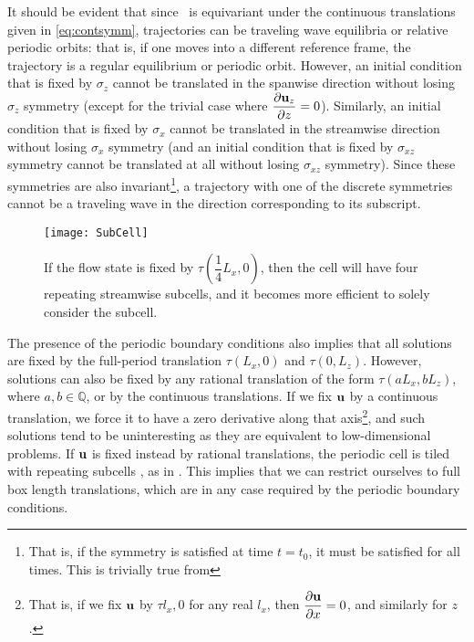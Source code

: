 It should be evident that since \pCf\ is equivariant under the continuous translations given in \eqref{eq:contsymm}, trajectories can be traveling wave equilibria or relative periodic orbits: that is, if one moves into a different reference frame, the trajectory is a regular equilibrium or periodic orbit. However, an initial condition that is fixed by $\sigma_z$ cannot be translated in the spanwise direction without losing $\sigma_z$ symmetry (except for the trivial case where $\pder{1}{\Vector{u}_z}{z} = 0$). Similarly, an initial condition that is fixed by $\sigma_x$ cannot be translated in the streamwise direction without losing $\sigma_x$ symmetry (and an initial condition that is fixed by $\sigma_{xz}$ symmetry cannot be translated at all without losing $\sigma_{xz}$ symmetry). Since these symmetries are also invariant\footnote{That is, if the symmetry is satisfied at time $t = t_0$, it must be satisfied for all times. This is trivially true from }, a trajectory with one of the discrete symmetries cannot be a traveling wave in the direction corresponding to its subscript. \\
 \begin{figure}[t!]
\texttt{[image: SubCell]}
\caption{If the flow state is fixed by $\tau(\dfrac{1}{4}L_x,0)$, then the cell will have four repeating streamwise subcells, and it becomes more efficient to solely consider the subcell.}\label{fig:rationalTranslation}

\end{figure}
The presence of the periodic boundary conditions also implies that all solutions are fixed by the full-period translation $\tau(L_x,0)$ and $\tau(0,L_z)$. However, solutions can also be fixed by any rational translation of the form $\tau(a L_x,b L_z)$, where $a,b \in \mathbb{Q}$, or by the continuous translations. If we fix $\mathbf{u}$ by a continuous translation, we force it to have a zero derivative along that axis\footnote{That is, if we fix $\mathbf{u}$ by $\tau{l_x,0}$ for any real $l_x$, then $\pder{1}{\Vector{u}}{x} = 0$, and similarly for $z$.}, and such solutions tend to be uninteresting as they are equivalent to low-dimensional problems. If $\mathbf{u}$ is fixed instead by rational translations, the periodic cell is tiled with repeating subcells , as in . This implies that we can restrict ourselves to full box length translations, which are in any case required by the periodic boundary conditions.\\

